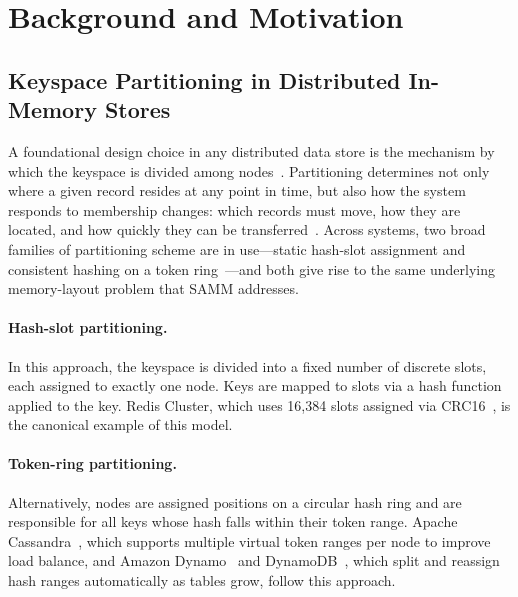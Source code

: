 \section{Background and Motivation}
\label{sec:background}

\subsection{Keyspace Partitioning in Distributed In-Memory Stores}
\label{sec:partitioning}

A foundational design choice in any distributed data store is the mechanism by which the keyspace is divided among nodes~\cite{slicer,shard-manager}. Partitioning determines not only where a given record resides at any point in time, but also how the system responds to membership changes: which records must move, how they are located, and how quickly they can be transferred~\cite{akkio}. Across systems, two broad families of partitioning scheme are in use---static hash-slot assignment and consistent hashing on a token ring~\cite{karger-consistent-hashing,dynamodb}---and both give rise to the same underlying memory-layout problem that SAMM addresses.

\paragraph{Hash-slot partitioning.}
In this approach, the keyspace is divided into a fixed number of discrete slots, each assigned to exactly one node. Keys are mapped to slots via a hash function applied to the key. Redis Cluster, which uses 16,384 slots assigned via CRC16~\cite{redisclusterconfig}, is the canonical example of this model.

\paragraph{Token-ring partitioning.}
Alternatively, nodes are assigned positions on a circular hash ring and are responsible for all keys whose hash falls within their token range. Apache Cassandra~\cite{cassandra-paper}, which supports multiple virtual token ranges per node to improve load balance, and Amazon Dynamo~\cite{dynamodb} and DynamoDB~\cite{dynamodb-atc22}, which split and reassign hash ranges automatically as tables grow, follow this approach.


